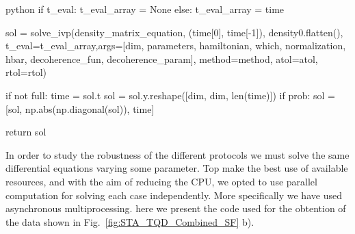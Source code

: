 \begin{mintedbox}{python}
	if t_eval:
		t_eval_array = None
	else:
		t_eval_array = time

	sol = solve_ivp(density_matrix_equation, (time[0], time[-1]), density0.flatten(), t_eval=t_eval_array,args=[dim, parameters, hamiltonian, which, normalization, hbar, decoherence_fun, decoherence_param], method=method, atol=atol,	rtol=rtol)

	if not full:
		time = sol.t
		sol = sol.y.reshape([dim, dim, len(time)])
		if prob:
			sol = [sol, np.abs(np.diagonal(sol)), time]

	return sol
\end{mintedbox}

In order to study the robustness of the different protocols we must solve the same differential equations varying some parameter. Top make the best use of available resources, and with the aim of reducing the CPU, we opted to use parallel computation for solving each case independently. More specifically we have used asynchronous multiprocessing. here we present the code used for the obtention of the data shown in Fig.~\ref{fig:STA_TQD_Combined_SF} b).

